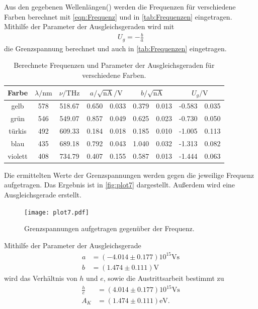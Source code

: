 Aus den gegebenen Wellenlängen(\cite[80]{V500}) werden die Frequenzen für verschiedene Farben berechnet mit \autoref{eqn:Frequenz}
und in \autoref{tab:Frequenzen} eingetragen.
Mithilfe der Parameter der Ausgleichsgeraden wird mit
\begin{align*}
  U_g = - \frac{b}{a}
\end{align*}
die Grenzspannung berechnet und auch in \autoref{tab:Frequenzen} eingetragen.
\begin{table}[H]
  \centering
  \caption{Berechnete Frequenzen und Parameter der Ausgleichsgeraden für verschiedene Farben.}
  \label{tab:Frequenzen}
  \begin{tabular}{c S[table-format=3.0] S[table-format=3.2] S@{${}\pm{}$} S S@{${}\pm{}$} S S[table-format=3.3]@{${}\pm{}$} S }
  \toprule
  {Farbe} & {$\lambda / \si{\nano\metre}$} & {$\nu / \si{\tera\hertz}$} & &  &  \\
  \midrule
    gelb    & 578 & 518.67 & 0.650 & 0.033 & 0.379 & 0.013 & -0.583 & 0.035 \\
    grün    & 546 & 549.07 & 0.857 & 0.049 & 0.625 & 0.023 & -0.730 & 0.050 \\
    türkis  & 492 & 609.33 & 0.184 & 0.018 & 0.185 & 0.010 & -1.005 & 0.113 \\
    blau    & 435 & 689.18 & 0.792 & 0.043 & 1.040 & 0.032 & -1.313 & 0.082 \\
    violett & 408 & 734.79 & 0.407 & 0.155 & 0.587 & 0.013 & -1.444 & 0.063 \\
  \bottomrule
  \end{tabular}
\end{table}

Die ermittelten Werte der Grenzspannungen werden gegen die jeweilige Frequenz aufgetragen.
Das Ergebnis ist in \autoref{fig:plot7} dargestellt.
Außerdem wird eine Ausgleichsgerade erstellt.
\begin{figure}[H]
  \centering
  \texttt{[image: plot7.pdf]}
  \caption{Grenzspannungen aufgetragen gegenüber der Frequenz.}
  \label{fig:plot7}
\end{figure}

Mithilfe der Parameter der Ausgleichsgerade
\begin{align*}
  a &= (-4.014 \pm 0.177) 10^15 \si{\volt\second} \\
  b &= (1.474 \pm 0.111) \si{\volt}
\end{align*}
wird das Verhältnis von $h$ und $e$, sowie die Austrittsarbeit bestimmt zu
\begin{align*}
  \frac{h}{e} &= (4.014 \pm 0.177) 10^15 \si{\volt\second} \\
  A_K &=  (1.474 \pm 0.111) \si{\electronvolt}.
\end{align*}

